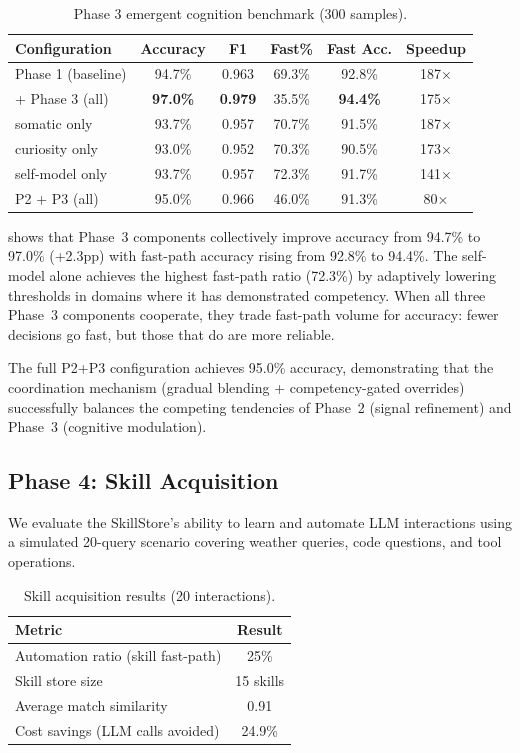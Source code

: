 \documentclass[11pt,a4paper]{article}
\begin{document}
\begin{table}[t]
\centering
\caption{Phase 3 emergent cognition benchmark (300 samples).}
\label{tab:phase3}
\begin{tabular}{lccccc}
\toprule
Configuration & Accuracy & F1 & Fast\% & Fast Acc. & Speedup \\
\midrule
Phase 1 (baseline) & 94.7\% & 0.963 & 69.3\% & 92.8\% & 187$\times$ \\
+ Phase 3 (all) & \textbf{97.0\%} & \textbf{0.979} & 35.5\% & \textbf{94.4\%} & 175$\times$ \\
\;\; somatic only & 93.7\% & 0.957 & 70.7\% & 91.5\% & 187$\times$ \\
\;\; curiosity only & 93.0\% & 0.952 & 70.3\% & 90.5\% & 173$\times$ \\
\;\; self-model only & 93.7\% & 0.957 & 72.3\% & 91.7\% & 141$\times$ \\
P2 + P3 (all) & 95.0\% & 0.966 & 46.0\% & 91.3\% & 80$\times$ \\
\bottomrule
\end{tabular}
\end{table}

 shows that Phase~3 components collectively improve accuracy from 94.7\% to 97.0\% (+2.3pp) with fast-path accuracy rising from 92.8\% to 94.4\%.
The self-model alone achieves the highest fast-path ratio (72.3\%) by adaptively lowering thresholds in domains where it has demonstrated competency.
When all three Phase~3 components cooperate, they trade fast-path volume for accuracy: fewer decisions go fast, but those that do are more reliable.

The full P2+P3 configuration achieves 95.0\% accuracy, demonstrating that the coordination mechanism (gradual blending + competency-gated overrides) successfully balances the competing tendencies of Phase~2 (signal refinement) and Phase~3 (cognitive modulation).

\subsection{Phase 4: Skill Acquisition}\label{sec:skill_exp}

We evaluate the SkillStore's ability to learn and automate LLM interactions using a simulated 20-query scenario covering weather queries, code questions, and tool operations.

\begin{table}[t]
\centering
\caption{Skill acquisition results (20 interactions).}
\label{tab:skill_acq}
\begin{tabular}{lc}
\toprule
Metric & Result \\
\midrule
Automation ratio (skill fast-path) & 25\% \\
Skill store size & 15 skills \\
Average match similarity & 0.91 \\
Cost savings (LLM calls avoided) & 24.9\% \\
\bottomrule
\end{tabular}
\end{table}
\end{document}
